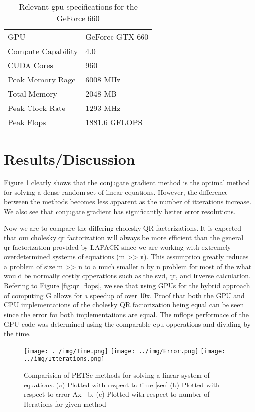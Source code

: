 \documentclass{article}[11pt]
\begin{document}
\begin{table}[!ht]
  \centering
  \caption{Relevant gpu specifications for the GeForce 660}
  \label{tab:gtx_660}

  \vspace{3mm}
  \begin{tabular}{ l | l }
    GPU & GeForce GTX 660 \\
    Compute Capability & 4.0 \\
    CUDA Cores & 960 \\
    Peak Memory Rage & 6008 MHz \\
    Total Memory & 2048 MB \\
    Peak Clock Rate & 1293 MHz \\
    Peak Flops & 1881.6 GFLOPS \\
  \end{tabular}
\end{table}

\section{Results/Discussion}

Figure \ref{fig:petsc_methods} clearly shows that the conjugate gradient method is the optimal method for solving a dense random set of linear equations. However, the difference between the methods becomes less apparent as the number of itterations increase. We also see that conjugate gradient has significantly better error resolutions.

Now we are to compare the differing cholesky QR factorizations. It is expected that our cholesky qr factorization will always be more efficient than the general qr factorization provided by LAPACK since we are working with extremely overdetermined systems of equations (m >> n). This assumption greatly reduces a problem of size m >> n to a much smaller n by n problem for most of the what would be normally costly opperations such as the svd, qr, and inverse calculation. Refering to Figure \ref{fig:qr_flops}, we see that using GPUs for the hybrid approach of computing G allows for a speedup of over 10x. Proof that both the GPU and CPU implementations of the cholesky QR factorization being equal can be seen since the error for both implementations are equal. The mflops performace of the GPU code was determined using the comparable cpu opperations and dividing by the time. 

\begin{figure}
  \centering
  \caption{Comparision of PETSc methods for solving a linear system of equations. (a) Plotted with respect to time [sec] (b) Plotted with respect to error Ax - b. (c) Plotted with respect to number of Iterations for given method}
  \label{fig:petsc_methods}

  \texttt{[image: ../img/Time.png]}
  \texttt{[image: ../img/Error.png]}
  \texttt{[image: ../img/Itterations.png]}
\end{figure}
\end{document}
